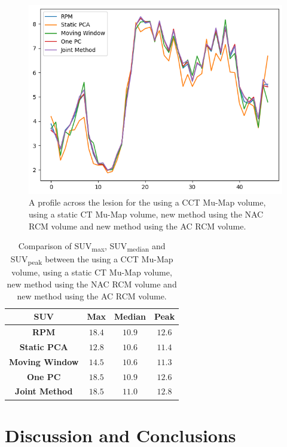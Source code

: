     \begin{figure}
        \centering
        \includegraphics[width=0.5\linewidth]{figures/profile_pca.png}
        \captionsetup{singlelinecheck=false, justification=centering}
        \caption{A profile across the lesion for the  using a \gls{CCT} \gls{Mu-Map} volume,  using a static \gls{CT} \gls{Mu-Map} volume, new method using the \gls{NAC} \gls{RCM} volume and new method using the \gls{AC} \gls{RCM} volume.}
        \label{fig:profile}
    \end{figure}
    
    \begin{table}
        \centering
        \captionsetup{singlelinecheck=false, justification=centering}
        \caption{Comparison of \gls{SUV}\textsubscript{max}, \gls{SUV}\textsubscript{median} and \gls{SUV}\textsubscript{peak} between the  using a \gls{CCT} \gls{Mu-Map} volume,  using a static \gls{CT} \gls{Mu-Map} volume, new method using the \gls{NAC} \gls{RCM} volume and new method using the \gls{AC} \gls{RCM} volume.}
        
        \resizebox*{1.0\linewidth}{!}
        {
            \begin{tabular}{||c|ccc||}
                \hline
                \textbf{\gls{SUV}} & \textbf{Max} & \textbf{Median} & \textbf{Peak} \\
                \hline
                \textbf{\gls{RPM}}          & $18.4$ & $10.9$ & $12.6$ \\
                \hline
                \textbf{Static \gls{PCA}}   & $12.8$ & $10.6$ & $11.4$ \\
                \textbf{Moving Window}      & $14.5$ & $10.6$ & $11.3$ \\
                \textbf{One \gls{PC}}       & $18.5$ & $10.9$ & $12.6$ \\
                \textbf{Joint Method}       & $18.5$ & $11.0$ & $12.8$ \\
                \hline
            \end{tabular}
        }
        \label{tab:suv}
    \end{table}
    
     

\section{Discussion and Conclusions} \label{sec:discussion_and_conclusions}
    